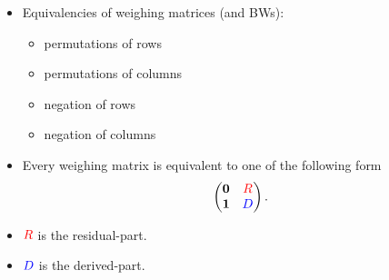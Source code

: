 \documentclass{beamer}
\newcommand{\RR}[1]{\textcolor{red}{#1}}
\newcommand{\BB}[1]{\textcolor{blue}{#1}}
\begin{document}
\begin{frame}

  \begin{itemize}
  \item Equivalencies of weighing matrices (and BWs):
    \begin{itemize}
    \item permutations of rows
    \item permutations of columns
    \item negation of rows
    \item negation of columns
    \end{itemize}
  \item Every weighing matrix is equivalent to one of the following form
    \[
      \begin{pmatrix}
        \textbf{0} & \RR{R} \\
        \textbf{1} & \BB{D}
      \end{pmatrix}.
    \]
  \item $\RR{R}$ is the residual-part.
  \item $\BB{D}$ is the derived-part.
  \end{itemize}
  
\end{frame}
\end{document}
